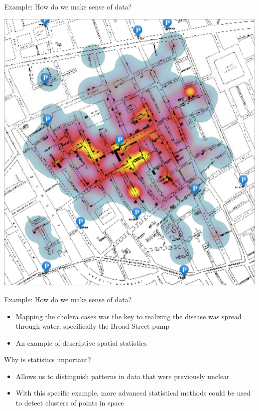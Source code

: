 \documentclass[10pt,t]{beamer}
\begin{document}
\begin{frame}[c]{Example: How do we make sense of data?}

\centering \includegraphics[scale=0.4]{cholera.png}

\end{frame}

\begin{frame}{Example: How do we make sense of data?}


\begin{itemize}
	\item Mapping the cholera cases was the key to realizing the disease was spread through water, specifically the Broad Street pump
	\item An example of descriptive spatial statistics
\end{itemize}

Why is statistics important?
\begin{itemize}
	\item Allows us to distinguish patterns in data that were previously unclear
	\item With this specific example, more advanced statistical methods could be used to detect clusters of points in space
\end{itemize}

\end{frame}
\end{document}
